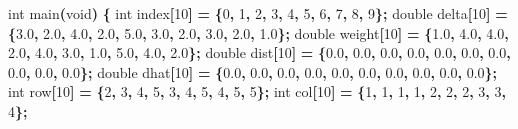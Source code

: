 \documentclass[
  12pt,
]{article}
\newenvironment{Shaded}{\begin{snugshade}}{\end{snugshade}}
\newcommand{\DataTypeTok}[1]{\textcolor[rgb]{0.13,0.29,0.53}{#1}}
\newcommand{\DecValTok}[1]{\textcolor[rgb]{0.00,0.00,0.81}{#1}}
\newcommand{\FloatTok}[1]{\textcolor[rgb]{0.00,0.00,0.81}{#1}}
\newcommand{\NormalTok}[1]{#1}
\newcommand{\OperatorTok}[1]{\textcolor[rgb]{0.81,0.36,0.00}{\textbf{#1}}}
\begin{document}
\begin{Shaded}
\begin{Highlighting}[]
\DataTypeTok{int}\NormalTok{ main}\OperatorTok{(}\DataTypeTok{void}\OperatorTok{)} \OperatorTok{\{}
    \DataTypeTok{int}\NormalTok{ index}\OperatorTok{[}\DecValTok{10}\OperatorTok{]} \OperatorTok{=} \OperatorTok{\{}\DecValTok{0}\OperatorTok{,} \DecValTok{1}\OperatorTok{,} \DecValTok{2}\OperatorTok{,} \DecValTok{3}\OperatorTok{,} \DecValTok{4}\OperatorTok{,} \DecValTok{5}\OperatorTok{,} \DecValTok{6}\OperatorTok{,} \DecValTok{7}\OperatorTok{,} \DecValTok{8}\OperatorTok{,} \DecValTok{9}\OperatorTok{\};}
    \DataTypeTok{double}\NormalTok{ delta}\OperatorTok{[}\DecValTok{10}\OperatorTok{]} \OperatorTok{=} \OperatorTok{\{}\FloatTok{3.0}\OperatorTok{,} \FloatTok{2.0}\OperatorTok{,} \FloatTok{4.0}\OperatorTok{,} \FloatTok{2.0}\OperatorTok{,} \FloatTok{5.0}\OperatorTok{,} \FloatTok{3.0}\OperatorTok{,} \FloatTok{2.0}\OperatorTok{,} \FloatTok{3.0}\OperatorTok{,} \FloatTok{2.0}\OperatorTok{,} \FloatTok{1.0}\OperatorTok{\};}
    \DataTypeTok{double}\NormalTok{ weight}\OperatorTok{[}\DecValTok{10}\OperatorTok{]} \OperatorTok{=} \OperatorTok{\{}\FloatTok{1.0}\OperatorTok{,} \FloatTok{4.0}\OperatorTok{,} \FloatTok{4.0}\OperatorTok{,} \FloatTok{2.0}\OperatorTok{,} \FloatTok{4.0}\OperatorTok{,} \FloatTok{3.0}\OperatorTok{,} \FloatTok{1.0}\OperatorTok{,} \FloatTok{5.0}\OperatorTok{,} \FloatTok{4.0}\OperatorTok{,} \FloatTok{2.0}\OperatorTok{\};}
    \DataTypeTok{double}\NormalTok{ dist}\OperatorTok{[}\DecValTok{10}\OperatorTok{]} \OperatorTok{=} \OperatorTok{\{}\FloatTok{0.0}\OperatorTok{,} \FloatTok{0.0}\OperatorTok{,} \FloatTok{0.0}\OperatorTok{,} \FloatTok{0.0}\OperatorTok{,} \FloatTok{0.0}\OperatorTok{,} \FloatTok{0.0}\OperatorTok{,} \FloatTok{0.0}\OperatorTok{,} \FloatTok{0.0}\OperatorTok{,} \FloatTok{0.0}\OperatorTok{,} \FloatTok{0.0}\OperatorTok{\};}
    \DataTypeTok{double}\NormalTok{ dhat}\OperatorTok{[}\DecValTok{10}\OperatorTok{]} \OperatorTok{=} \OperatorTok{\{}\FloatTok{0.0}\OperatorTok{,} \FloatTok{0.0}\OperatorTok{,} \FloatTok{0.0}\OperatorTok{,} \FloatTok{0.0}\OperatorTok{,} \FloatTok{0.0}\OperatorTok{,} \FloatTok{0.0}\OperatorTok{,} \FloatTok{0.0}\OperatorTok{,} \FloatTok{0.0}\OperatorTok{,} \FloatTok{0.0}\OperatorTok{,} \FloatTok{0.0}\OperatorTok{\};}
    \DataTypeTok{int}\NormalTok{ row}\OperatorTok{[}\DecValTok{10}\OperatorTok{]} \OperatorTok{=} \OperatorTok{\{}\DecValTok{2}\OperatorTok{,} \DecValTok{3}\OperatorTok{,} \DecValTok{4}\OperatorTok{,} \DecValTok{5}\OperatorTok{,} \DecValTok{3}\OperatorTok{,} \DecValTok{4}\OperatorTok{,} \DecValTok{5}\OperatorTok{,} \DecValTok{4}\OperatorTok{,} \DecValTok{5}\OperatorTok{,} \DecValTok{5}\OperatorTok{\};}
    \DataTypeTok{int}\NormalTok{ col}\OperatorTok{[}\DecValTok{10}\OperatorTok{]} \OperatorTok{=} \OperatorTok{\{}\DecValTok{1}\OperatorTok{,} \DecValTok{1}\OperatorTok{,} \DecValTok{1}\OperatorTok{,} \DecValTok{1}\OperatorTok{,} \DecValTok{2}\OperatorTok{,} \DecValTok{2}\OperatorTok{,} \DecValTok{2}\OperatorTok{,} \DecValTok{3}\OperatorTok{,} \DecValTok{3}\OperatorTok{,} \DecValTok{4}\OperatorTok{\};}

\end{Highlighting}
\end{Shaded}
\end{document}
